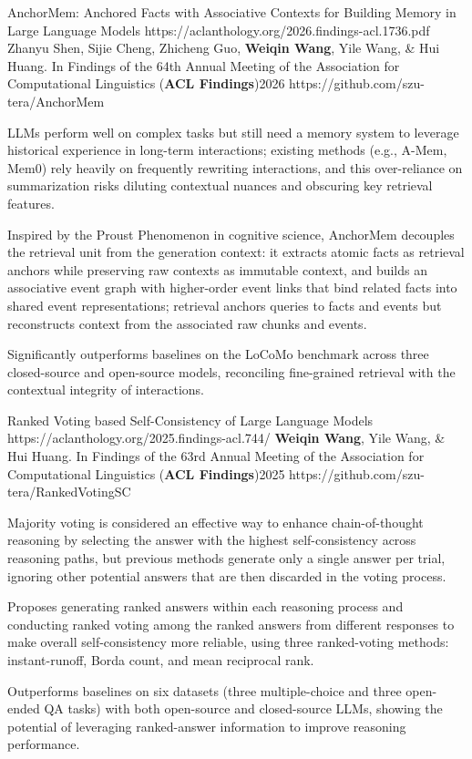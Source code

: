 \pub
  {AnchorMem: Anchored Facts with Associative Contexts for Building Memory in Large Language Models}
  {https://aclanthology.org/2026.findings-acl.1736.pdf}
  {Zhanyu Shen, Sijie Cheng, Zhicheng Guo, \textbf{Weiqin Wang}, Yile Wang, \& Hui Huang.}
  {In Findings of the 64th Annual Meeting of the Association for Computational Linguistics (\textbf{ACL Findings})}{2026}
  {https://github.com/szu-tera/AnchorMem}
\begin{pubnotes}
  \item {}LLMs perform well on complex tasks but still need a memory system to leverage historical experience in long-term interactions; existing methods (e.g., A-Mem, Mem0) rely heavily on frequently rewriting interactions, and this over-reliance on summarization risks diluting contextual nuances and obscuring key retrieval features.
  \item {}Inspired by the Proust Phenomenon in cognitive science, AnchorMem decouples the retrieval unit from the generation context: it extracts atomic facts as retrieval anchors while preserving raw contexts as immutable context, and builds an associative event graph with higher-order event links that bind related facts into shared event representations; retrieval anchors queries to facts and events but reconstructs context from the associated raw chunks and events.
  \item {}Significantly outperforms baselines on the LoCoMo benchmark across three closed-source and open-source models, reconciling fine-grained retrieval with the contextual integrity of interactions.
\end{pubnotes}

\pub
  {Ranked Voting based Self-Consistency of Large Language Models}
  {https://aclanthology.org/2025.findings-acl.744/}
  {\textbf{Weiqin Wang}, Yile Wang, \& Hui Huang.}
  {In Findings of the 63rd Annual Meeting of the Association for Computational Linguistics (\textbf{ACL Findings})}{2025}
  {https://github.com/szu-tera/RankedVotingSC}
\begin{pubnotes}
  \item {}Majority voting is considered an effective way to enhance chain-of-thought reasoning by selecting the answer with the highest self-consistency across reasoning paths, but previous methods generate only a single answer per trial, ignoring other potential answers that are then discarded in the voting process.
  \item {}Proposes generating ranked answers within each reasoning process and conducting ranked voting among the ranked answers from different responses to make overall self-consistency more reliable, using three ranked-voting methods: instant-runoff, Borda count, and mean reciprocal rank.
  \item {}Outperforms baselines on six datasets (three multiple-choice and three open-ended QA tasks) with both open-source and closed-source LLMs, showing the potential of leveraging ranked-answer information to improve reasoning performance.
\end{pubnotes}

